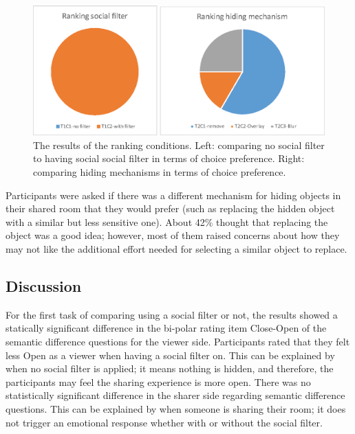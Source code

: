 \begin{figure}[h]
    \begin{center}
    \includegraphics[width=.8\linewidth]{images/54-hiding-frontier18/images-22.eps}
    \caption{The results of the ranking conditions. Left: comparing no social filter to having social social filter in terms of choice preference. Right: comparing hiding mechanisms in terms of choice preference.}
    \label{fig:frontier18:result-ranking}
    \end{center}
\end{figure}

Participants were asked if there was a different mechanism for hiding objects in their shared room that they would prefer (such as replacing the hidden object with a similar but less sensitive one). About 42\% thought that replacing the object was a good idea; however, most of them raised concerns about how they may not like the additional effort needed for selecting a similar object to replace.

\subsection{Discussion}

For the first task of comparing using a social filter or not, the results showed a statically significant difference in the bi-polar rating item Close-Open of the semantic difference questions for the viewer side. Participants rated that they felt less Open as a viewer when having a social filter on. This can be explained by when no social filter is applied; it means nothing is hidden, and therefore, the participants may feel the sharing experience is more open. There was no statistically significant difference in the sharer side regarding semantic difference questions. This can be explained by when someone is sharing their room; it does not trigger an emotional response whether with or without the social filter. 

